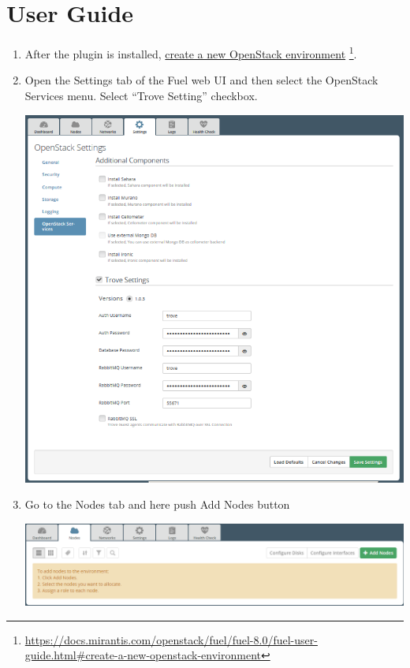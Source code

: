 \documentclass[letterpaper,10pt,english]{sphinxmanual}
\begin{document}
\chapter{User Guide}
\label{user_guide:user-guide}\label{user_guide:github}\label{user_guide::doc}\label{user_guide:id1}\begin{enumerate}
\item {} 
After the plugin is installed, \href{https://docs.mirantis.com/openstack/fuel/fuel-8.0/fuel-user-guide.html\#create-a-new-openstack-environment}{create a new OpenStack environment} \footnote{
\href{https://docs.mirantis.com/openstack/fuel/fuel-8.0/fuel-user-guide.html\#create-a-new-openstack-environment}{https://docs.mirantis.com/openstack/fuel/fuel-8.0/fuel-user-guide.html\#create-a-new-openstack-environment}
}.

\item {} 
Open the Settings tab of the Fuel web UI and then select the OpenStack
Services menu. Select ``Trove Setting'' checkbox.

\includegraphics{enable_plugin.png}

\item {} 
Go to the Nodes tab and here push Add Nodes button

\includegraphics{nodes_tab.png}


\end{enumerate}
\end{document}
